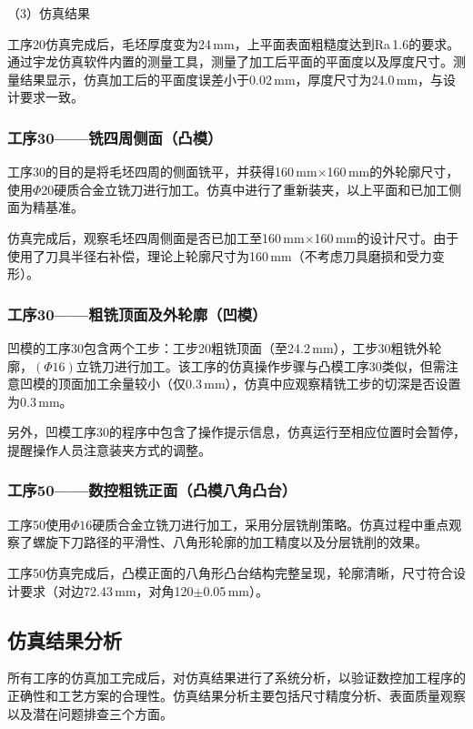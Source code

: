 \documentclass{xautCADreport}
\begin{document}
（3）仿真结果

工序20仿真完成后，毛坯厚度变为24\,mm，上平面表面粗糙度达到Ra\,1.6的要求。通过宇龙仿真软件内置的测量工具，测量了加工后平面的平面度以及厚度尺寸。测量结果显示，仿真加工后的平面度误差小于0.02\,mm，厚度尺寸为24.0\,mm，与设计要求一致。

\subsubsection{工序30——铣四周侧面（凸模）}

工序30的目的是将毛坯四周的侧面铣平，并获得160\,mm$\times$160\,mm的外轮廓尺寸，使用$\Phi20$硬质合金立铣刀进行加工。仿真中进行了重新装夹，以上平面和已加工侧面为精基准。

仿真完成后，观察毛坯四周侧面是否已加工至160\,mm$\times$160\,mm的设计尺寸。由于使用了刀具半径右补偿，理论上轮廓尺寸为160\,mm（不考虑刀具磨损和受力变形）。

\subsubsection{工序30——粗铣顶面及外轮廓（凹模）}

凹模的工序30包含两个工步：工步20粗铣顶面（至24.2\,mm），工步30粗铣外轮廓，$(\Phi16)$立铣刀进行加工。该工序的仿真操作步骤与凸模工序30类似，但需注意凹模的顶面加工余量较小（仅0.3\,mm），仿真中应观察精铣工步的切深是否设置为0.3\,mm。

另外，凹模工序30的程序中包含了操作提示信息，仿真运行至相应位置时会暂停，提醒操作人员注意装夹方式的调整。

\subsubsection{工序50——数控粗铣正面（凸模八角凸台）}

工序50使用$\Phi16$硬质合金立铣刀进行加工，采用分层铣削策略。仿真过程中重点观察了螺旋下刀路径的平滑性、八角形轮廓的加工精度以及分层铣削的效果。

工序50仿真完成后，凸模正面的八角形凸台结构完整呈现，轮廓清晰，尺寸符合设计要求（对边72.43\,mm，对角120$\pm$0.05\,mm）。

\subsection{仿真结果分析}

所有工序的仿真加工完成后，对仿真结果进行了系统分析，以验证数控加工程序的正确性和工艺方案的合理性。仿真结果分析主要包括尺寸精度分析、表面质量观察以及潜在问题排查三个方面。
\end{document}
